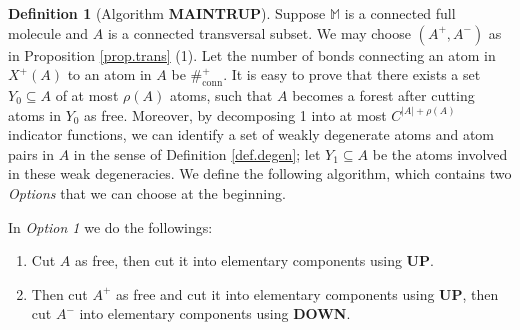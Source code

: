 \documentclass[10pt, reqno]{amsart}
\newcommand{\Mb}{\mathbb M}
\theoremstyle{definition}
\newtheorem{definition}[theorem]{Definition}
\theoremstyle{remark}
\numberwithin{equation}{section}
\begin{document}
\begin{definition}[Algorithm \textbf{MAINTRUP}] 
\label{def.alg_maintrup}
Suppose $\Mb$ is a connected full molecule and $A$ is a connected transversal subset. We may choose $(A^+,A^-)$ as in Proposition \ref{prop.trans} (1). Let the number of bonds connecting an atom in $X^+(A)$ to an atom in $A$ be $\#_{\mathrm{conn}}^+$. It is easy to prove that there exists a set $Y_0\subseteq A$ of at most $\rho(A)$ atoms, such that $A$ becomes a forest after cutting atoms in $Y_0$ as free. Moreover, by decomposing 1 into at most $C^{|A|+\rho(A)}$ indicator functions, we can identify a set of weakly degenerate atoms and atom pairs in $A$ in the sense of Definition \ref{def.degen}; let $Y_1\subseteq A$ be the atoms involved in these weak degeneracies. We define the following algorithm, which contains two \emph{Options} that we can choose at the beginning.

In \emph{Option 1} we do the followings:
\begin{enumerate}
\item Cut $A$ as free, then cut it into elementary components using \textbf{UP}.
\item Then cut $A^+$ as free and cut it into elementary components using \textbf{UP}, then cut $A^-$ into elementary components using \textbf{DOWN}.
\end{enumerate}


\end{definition}
\end{document}
